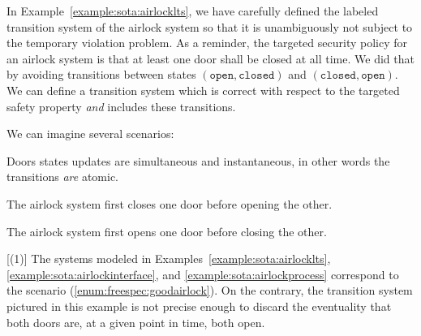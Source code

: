 \begin{example}
  In Example~\ref{example:sota:airlocklts}, we have carefully defined the
  labeled transition system of the airlock system so that it is unambiguously
  not subject to the temporary violation problem.
  As a reminder, the targeted security policy for an airlock system is that at
  least one door shall be closed at all time.
  We did that by avoiding transitions between states
  \( (\mathtt{open}, \mathtt{closed}) \) and
  \( (\mathtt{closed}, \mathtt{open}) \).
  We can define a transition system which is correct with respect to the
  targeted safety property \emph{and} includes these transitions.

  \begin{center}
  \end{center}

  We can imagine several scenarios:
  \begin{inparaenum}[(1)]
  \item Doors states updates are simultaneous and instantaneous, in other words
    the transitions \emph{are} atomic.
  \item The airlock system first closes one door before opening the
    other. \label{enum:freespec:goodairlock}
  \item The airlock system first opens one door before closing the
    other. \label{enum:freespec:badairlock}
  \end{inparaenum}[(1)]
  The systems modeled in Examples~\ref{example:sota:airlocklts},
  \ref{example:sota:airlockinterface}, and \ref{example:sota:airlockprocess}
  correspond to the scenario (\ref{enum:freespec:goodairlock}).
  On the contrary, the transition system pictured in this example is not precise
  enough to discard the eventuality that both doors are, at a given point in
  time, both open.
\end{example}

